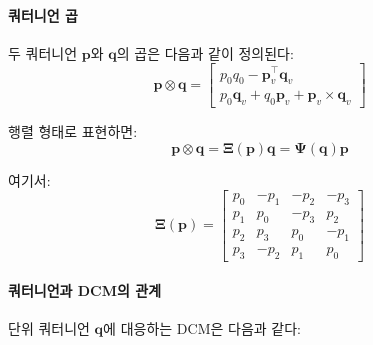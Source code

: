             \paragraph{쿼터니언 곱}
                두 쿼터니언 $\mathbf{p}$와 $\mathbf{q}$의 곱은 다음과 같이 정의된다:\\

                \begin{equation}
                    \mathbf{p} \otimes \mathbf{q} = \begin{bmatrix}
                        p_0 q_0 - \mathbf{p}_v^\top \mathbf{q}_v \\
                        p_0 \mathbf{q}_v + q_0 \mathbf{p}_v + \mathbf{p}_v \times \mathbf{q}_v
                    \end{bmatrix}
                    \label{eq:quat_product}
                \end{equation}

                행렬 형태로 표현하면:\\

                \begin{equation}
                    \mathbf{p} \otimes \mathbf{q} = \boldsymbol{\Xi}(\mathbf{p})\mathbf{q} = \boldsymbol{\Psi}(\mathbf{q})\mathbf{p}
                    \label{eq:quat_product_matrix}
                \end{equation}

                \noindent 여기서:\\

                \begin{equation}
                    \boldsymbol{\Xi}(\mathbf{p}) = \begin{bmatrix}
                        p_0 & -p_1 & -p_2 & -p_3 \\
                        p_1 &  p_0 & -p_3 &  p_2 \\
                        p_2 &  p_3 &  p_0 & -p_1 \\
                        p_3 & -p_2 &  p_1 &  p_0
                    \end{bmatrix}
                    \label{eq:xi_matrix}
                \end{equation}

            \paragraph{쿼터니언과 DCM의 관계}
                단위 쿼터니언 $\mathbf{q}$에 대응하는 DCM은 다음과 같다:\\


